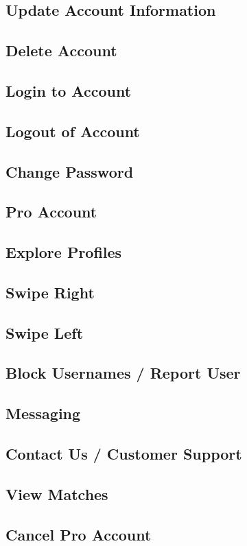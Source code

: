 \documentclass[10pt, draft]{article}
\begin{document}
\subsection{Update Account Information}
\subsection{Delete Account}
\subsection{Login to Account}
\subsection{Logout of Account}
\subsection{Change Password}
\subsection{Pro Account}
\subsection{Explore Profiles}
\subsection{Swipe Right}
\subsection{Swipe Left}
\subsection{Block Usernames / Report User}
\subsection{Messaging}
\subsection{Contact Us / Customer Support}
\subsection{View Matches}
\subsection{Cancel Pro Account}
\end{document}
